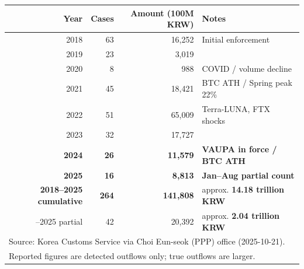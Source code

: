 \begin{tabular}{rrrl}
\toprule
Year & Cases & Amount (100M KRW) & Notes \\
\midrule
2018 & 63 & 16,252 & Initial enforcement \\
2019 & 23 & 3,019 &  \\
2020 & 8 & 988 & COVID / volume decline \\
2021 & 45 & 18,421 & BTC ATH / Spring peak 22\% \\
2022 & 51 & 65,009 & Terra-LUNA, FTX shocks \\
2023 & 32 & 17,727 &  \\
\textbf{2024} & \textbf{26} & \textbf{11,579} & \textbf{VAUPA in force / BTC ATH} \\
\textbf{2025} & \textbf{16} & \textbf{8,813} & \textbf{Jan--Aug partial count} \\
\midrule
\textbf{2018--2025 cumulative} & \textbf{264} & \textbf{141,808} & approx. \textbf{14.18 trillion KRW} \\
\quad 2024--2025 partial & 42 & 20,392 & approx. \textbf{2.04 trillion KRW} \\
\bottomrule
\multicolumn{4}{l}{\footnotesize Source: Korea Customs Service via Choi Eun-seok (PPP) office (2025-10-21).}\\
\multicolumn{4}{l}{\footnotesize Reported figures are detected outflows only; true outflows are larger.}\\
\end{tabular}